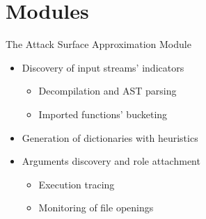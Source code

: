 \section{Modules}

\begin{frame}{The Attack Surface Approximation Module}
    \begin{figure}
        \centering
        \hspace{1em}
        \hspace{1em}
        \hspace{1em}
    \end{figure}
    \vfill
    \pause

    \begin{itemize}
        \item Discovery of input streams' indicators
              \begin{itemize}
                  \item Decompilation and AST parsing
                  \item Imported functions' bucketing \pause
              \end{itemize}
        \item Generation of dictionaries with heuristics\pause
        \item Arguments discovery and role attachment
              \begin{itemize}
                  \item Execution tracing
                  \item Monitoring of file openings
              \end{itemize}
    \end{itemize}
\end{frame}

